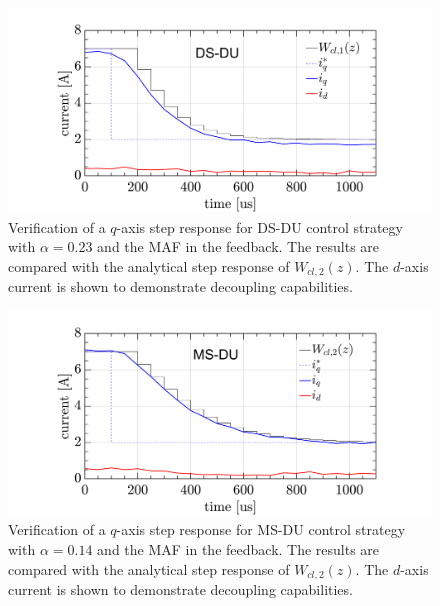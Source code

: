 \documentclass[journal]{IEEEtran}
\begin{document}
\begin{figure}[t!]
    \centerline{\includegraphics[width=1\linewidth]{figures/ivan figs/DSDUstepHIL.png}}
    \caption{Verification of a $q$-axis step response for DS-DU control strategy with $\alpha = 0.23$ and the MAF in the feedback. The results are compared with the analytical step response of $W_{cl,2}(z)$. The $d$-axis current is shown to demonstrate decoupling capabilities.}
    \label{fig:DSDU_step} 
\end{figure}
\begin{figure}[t!]
    \centerline{\includegraphics[width=1\linewidth]{figures/ivan figs/MSDUstepHIL.png}}
    \caption{Verification of a $q$-axis step response for MS-DU control strategy with $\alpha = 0.14$ and the MAF in the feedback. The results are compared with the analytical step response of $W_{cl,2}(z)$. The $d$-axis current is shown to demonstrate decoupling capabilities.}
    \label{fig:MSDU_step} 
\end{figure}
\end{document}
